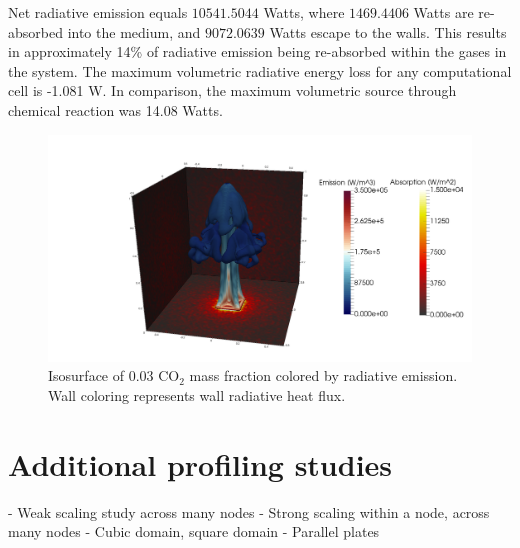 Net radiative emission equals $10541.5044$ Watts, where $1469.4406$ Watts are re-absorbed into the medium, and $9072.0639$ Watts escape to the walls. This results in approximately 14\% of radiative emission being re-absorbed within the gases in the system. 
The maximum volumetric radiative energy loss for any computational cell is -1.081 W. In comparison, the maximum volumetric source through chemical reaction was 14.08 Watts.

\begin{figure}
\includegraphics[width=\linewidth]{figures/ch4/radiation_contours.png}
\caption{Isosurface of 0.03 CO$_2$ mass fraction colored by radiative emission. Wall coloring represents wall radiative heat flux.}
\label{fig:PoolFire_radiationcontours}
\end{figure}



\section{Additional profiling studies}


- Weak scaling study across many nodes
- Strong scaling within a node, across many nodes
    - Cubic domain, square domain
    - Parallel plates
    
